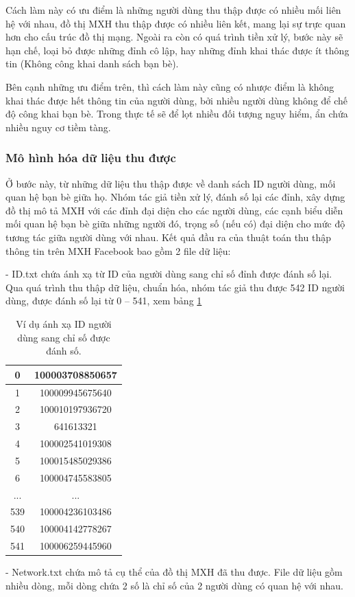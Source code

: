 		Cách làm này có ưu điểm là những người dùng thu thập được có nhiều mối liên hệ với nhau, đồ thị MXH thu thập được có nhiều liên kết, mang lại sự trực quan hơn cho cấu trúc đồ thị mạng. Ngoài ra còn có quá trình tiền xử lý, bước này sẽ hạn chế, loại bỏ được những đỉnh cô lập, hay những đỉnh khai thác được ít thông tin (Không công khai danh sách bạn bè).
		
		Bên cạnh những ưu điểm trên, thì cách làm này cũng có nhược điểm là không khai thác được hết thông tin của người dùng, bởi nhiều người dùng không để chế độ công khai bạn bè. Trong thực tế sẽ để lọt nhiều đối tượng nguy hiểm, ẩn chứa nhiều nguy cơ tiềm tàng.
		
		\subsubsection{Mô hình hóa dữ liệu thu được}
		Ở bước này, từ những dữ liệu thu thập được về danh sách ID người dùng, mối quan hệ bạn bè giữa họ. Nhóm tác giả tiền xử lý, đánh số lại các đỉnh, xây dựng đồ thị mô tả MXH với các đỉnh đại diện cho các người dùng, các cạnh biểu diễn mối quan hệ bạn bè giữa những người đó, trọng số (nếu có) đại diện cho mức độ tương tác giữa người dùng với nhau. Kết quả đầu ra của thuật toán thu thập thông tin trên MXH Facebook bao gồm 2 file dữ liệu:
		
		- ID.txt chứa ánh xạ từ ID của người dùng sang chỉ số đỉnh được đánh số lại. Qua quá trình thu thập dữ liệu, chuẩn hóa, nhóm tác giả thu được 542 ID người dùng, được đánh số lại từ 0 – 541, xem bảng \ref{bang3_1}		
		\begin{table} [!htp]
			\centering 
			\begin{tabular}{|c|c|}
			\hline 
			0 & 100003708850657 \\ 
			\hline 
			1 & 100009945675640 \\ 
			\hline 
			2 & 100010197936720 \\ 
			\hline 
			3 & 641613321 \\ 
			\hline 
			4 & 100002541019308 \\ 
			\hline 
			5 & 100015485029386 \\ 
			\hline 
			6 & 100004745583805 \\ 
			\hline 
			... & ... \\ 
			\hline 
			539 & 100004236103486 \\ 
			\hline 
			540 & 100004142778267 \\ 
			\hline 
			541 & 100006259445960 \\ 
			\hline 
			\end{tabular} 
			\caption{Ví dụ ánh xạ ID người dùng sang chỉ số được đánh số.}
			\label{bang3_1}
		\end{table}
		 - Network.txt chứa mô tả cụ thể của đồ thị MXH đã thu được. File dữ liệu gồm nhiều dòng, mỗi dòng chứa 2 số là chỉ số của 2 người dùng có quan hệ với nhau.
		 
